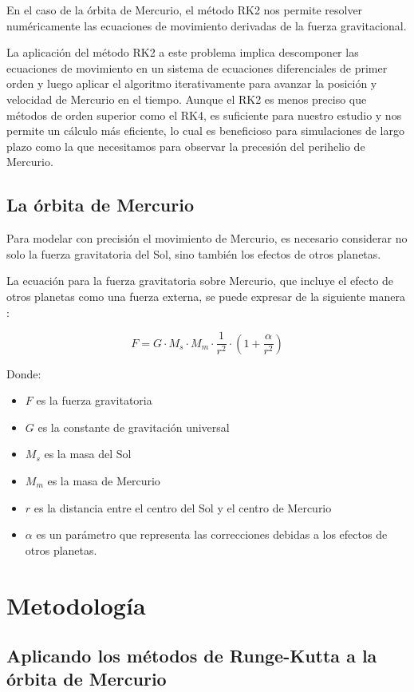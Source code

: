 \documentclass[twocolumn]{article}
\begin{document}
En el caso de la órbita de Mercurio, el método RK2 nos permite resolver numéricamente las ecuaciones de movimiento derivadas de la fuerza gravitacional.

La aplicación del método RK2 a este problema implica descomponer las ecuaciones de movimiento en un sistema de ecuaciones diferenciales de primer orden y luego aplicar el algoritmo iterativamente para avanzar la posición y velocidad de Mercurio en el tiempo. Aunque el RK2 es menos preciso que métodos de orden superior como el RK4, es suficiente para nuestro estudio y nos permite un cálculo más eficiente, lo cual es beneficioso para simulaciones de largo plazo como la que necesitamos para observar la precesión del perihelio de Mercurio.

\subsection{La órbita de Mercurio}

Para modelar con precisión el movimiento de Mercurio, es necesario considerar no solo la fuerza gravitatoria del Sol, sino también los efectos de otros planetas.

La ecuación para la fuerza gravitatoria sobre Mercurio, que incluye el efecto de otros planetas como una fuerza externa, se puede expresar de la siguiente manera \cite{chang}:

\begin{equation}
F = G \cdot M_s \cdot M_m \cdot \frac{1}{r^2} \cdot (1 + \frac{\alpha}{r^2})
\end{equation}

Donde:
\begin{itemize}
\item $F$ es la fuerza gravitatoria
\item $G$ es la constante de gravitación universal
\item $M_s$ es la masa del Sol
\item $M_m$ es la masa de Mercurio
\item $r$ es la distancia entre el centro del Sol y el centro de Mercurio
\item $\alpha$ es un parámetro que representa las correcciones debidas a los efectos de otros planetas.
\end{itemize}

\section{Metodología}
\subsection{Aplicando los métodos de Runge-Kutta a la órbita de Mercurio}
\end{document}
